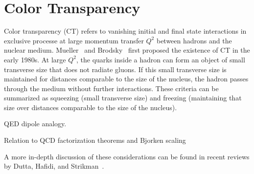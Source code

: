 \section{Color Transparency}
Color transparency (CT) refers to vanishing initial and final state
interactions in exclusive processe at large momentum transfer $Q^2$
between hadrons and the nuclear medium.
Mueller~\cite{Mueller_1981} and Brodsky~\cite{Brodsky_1982} first proposed the
existence of CT in the early 1980s.
At large $Q^2$, the quarks inside a hadron can form an object of small
transverse size that does not radiate gluons.
If this small transverse size is maintained for distances comparable to the
size of the nucleus, the hadron passes through the medium without further
interactions.
These criteria can be summarized as squeezing (small transverse size) and
freezing (maintaining that size over distances comparable to the size of the
nucleus).

QED dipole analogy.

Relation to QCD factorization theorems and Bjorken scaling

A more in-depth discussion of these considerations can be found in recent
reviews by Dutta, Hafidi, and Strikman~\cite{Dutta_2013,Dutta_2012}.

